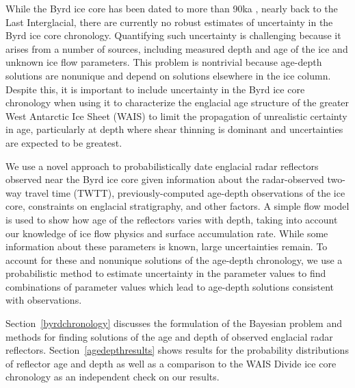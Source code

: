 While the Byrd ice core has been dated to more than 90ka \citep{blunier2001}, nearly back to the Last Interglacial, there are currently no robust estimates of uncertainty in the Byrd ice core chronology. Quantifying such uncertainty is challenging because it arises from a number of sources, including measured depth and age of the ice and unknown ice flow parameters. This problem is nontrivial because age-depth solutions are nonunique and depend on solutions elsewhere in the ice column. Despite this, it is important to include uncertainty in the Byrd ice core chronology when using it to characterize the englacial age structure of the greater West Antarctic Ice Sheet (WAIS) to limit the propagation of unrealistic certainty in age, particularly at depth where shear thinning is dominant and uncertainties are expected to be greatest. 

 

We use a novel approach to probabilistically date englacial radar reflectors observed near the Byrd ice core given information about the radar-observed two-way travel time (TWTT), previously-computed age-depth observations of the ice core, constraints on englacial stratigraphy, and other factors. A simple flow model is used to show how age of the reflectors varies with depth, taking into account our knowledge of ice flow physics and surface accumulation rate. While some information about these parameters is known, large uncertainties remain. To account for these and nonunique solutions of the age-depth chronology, we use a probabilistic method to estimate uncertainty in the parameter values to find combinations of parameter values which lead to age-depth solutions consistent with observations.





Section~\ref{byrdchronology} discusses the formulation of the Bayesian problem and methods for finding solutions of the age and depth of observed englacial radar reflectors. Section~\ref{agedepthresults} shows results for the probability distributions of reflector age and depth as well as a comparison to the WAIS Divide ice core chronology as an independent check on our results. %

